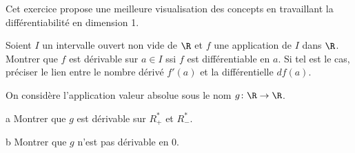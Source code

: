 \documentclass{report}
\begin{document}
\begin{exo}
    Cet exercice propose une meilleure visualisation des concepts en travaillant
    la différentiabilité en dimension 1.
    \begin{q}{1}
        Soient \(I\) un intervalle ouvert non vide de \(\R\) et \(f\) une application
        de \(I\) dans \(\R\). Montrer que \(f\) est dérivable sur \(a\in I\) ssi
        \(f\) est différentiable en \(a\). Si tel est le cas, préciser le lien entre
        le nombre dérivé \(f'(a)\) et la différentielle \(df(a)\).
    \end{q}
    \begin{q}{2}
        On considère l'application valeur absolue sous le nom \(g\colon\R\to\R\).
        \begin{q}{a}
            Montrer que \(g\) est dérivable sur \(R_+^*\) et \(R_-^*\).
        \end{q}
        \begin{q}{b}
            Montrer que \(g\) n'est pas dérivable en \(0\).
        \end{q}
    \end{q}
\end{exo}
\end{document}
